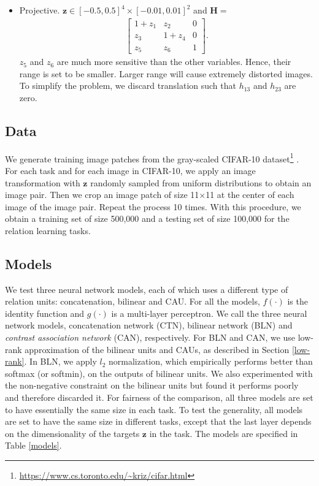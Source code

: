 \documentclass[conference]{IEEEtran}
\begin{document}
\begin{itemize}
\vspace{0.5cm}
\item Projective. 
$\mathbf{z} \in [-0.5,0.5]^4\times[-0.01,0.01]^2$
and $\mathbf{H}=$
\begin{align*}
\begin{bmatrix} 
1 + z_1 & z_2      & 0 \\
z_3     & 1 + z_4  & 0 \\
z_5 & z_6 & 1
\end{bmatrix}.
\end{align*}
$z_5$ and $z_6$ are much more sensitive than the other variables. Hence, their range is set to be smaller. Larger range will cause extremely distorted images. To simplify the problem, we discard translation such that $h_{13}$ and $h_{23}$ are zero.
\end{itemize}

\subsection{Data}
We generate training image patches from the gray-scaled
CIFAR-10 dataset\footnote{\url{https://www.cs.toronto.edu/~kriz/cifar.html}} \cite{krizhevsky2009learning}. 
For each task and for each image in CIFAR-10, we apply an image transformation with $\mathbf{z}$ randomly sampled from uniform distributions to obtain an image pair. Then we crop an image patch of size 11$\times$11 at the center of each image of the image pair. Repeat the process 10 times. With this procedure, we obtain a training set of size 500,000 and a testing set of size 100,000 for the relation learning tasks.


\subsection{Models}
We test three neural network models, each of which uses a different type of relation units: concatenation, bilinear and CAU. For all the models, $f(\cdot)$ is the identity function and $g(\cdot)$ is a multi-layer perceptron. We call the three neural network models,  concatenation network (CTN), bilinear network (BLN) and \textit{contrast association network} (CAN), respectively. 
For BLN and CAN, we use low-rank approximation of the bilinear units and CAUs, as described in Section \ref{low-rank}.
In BLN, we apply $l_2$ normalization, which empirically performs better than softmax (or softmin), on the outputs of bilinear units. We also experimented with the non-negative constraint on the bilinear units but found it performs poorly and therefore discarded it.
For fairness of the comparison, all three models are set to have essentially the same size in each task. To test the generality, all models are set to have the same size in different tasks, except that the last layer depends on the dimensionality of the targets $\mathbf{z}$ in the task. The models are specified in Table \ref{models}. 
\end{document}
